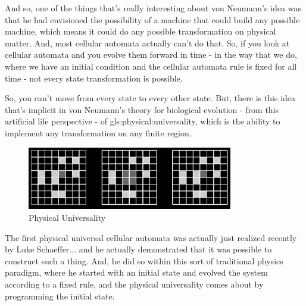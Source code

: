 \documentclass[]{article}
\begin{document}
And so, one of the things that's really
interesting about von Neumann's idea
was that he had envisioned
the possibility of a machine
that could build any possible machine,
which means it could do any possible
transformation on physical matter.
And, most cellular automata
actually can't do that.
So, if you look at cellular automata
and you evolve them forward in time -
in the way that we do,
where we have an initial condition
and the cellular automata rule
is fixed for all time -
not every state transformation
is possible.

So, you can't move from every state
to every other state.
But, there is this idea
that's implicit in von Neumann's theory
for biological evolution -
from this artificial life perspective -
of \gls{gls:physical:universality},
which is the ability to implement
any transformation on any finite region.

\begin{figure}[H]
	\caption[Physical Universality]{Physical Universality\cite{janzing2010there,schaeffer2014physicallyuniversal}}\label{fig:physicalUniversality}
	\includegraphics[width=0.8\textwidth]{physicalUniversality}
\end{figure}

The first physical universal
cellular automata
was actually just realized recently
by Luke Schaeffer...
and he actually demonstrated
that it was possible
to construct such a thing.
And, he did so within this sort of
traditional physics paradigm,
where he started with an initial state
and evolved the system
according to a fixed rule,
and the physical universality
comes about by programming
the initial state.
\end{document}
